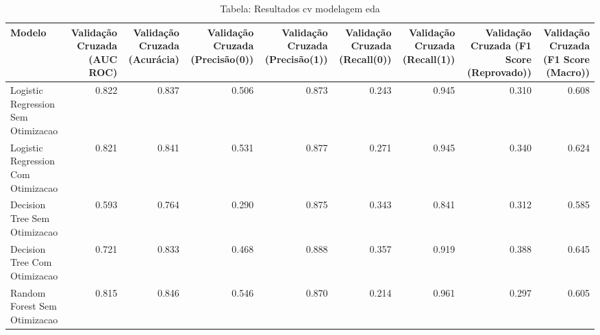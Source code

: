 \begin{table}[H] %
    \centering
    \caption{Tabela: Resultados cv modelagem eda}
    \label{tab:resultados_cv_modelagem_eda}
    \renewcommand{\arraystretch}{1.25} %
    \begin{adjustwidth}{ -1in }{ -1in } %
    \centering %
    \small %
    \begin{tabular}{lrrrrrrrr}
\toprule
                            Modelo &  Validação Cruzada (AUC ROC) &  Validação Cruzada (Acurácia) &  Validação Cruzada (Precisão(0)) &  Validação Cruzada (Precisão(1)) &  Validação Cruzada (Recall(0)) &  Validação Cruzada (Recall(1)) &  Validação Cruzada (F1 Score (Reprovado)) &  Validação Cruzada (F1 Score (Macro)) \\
\midrule
Logistic Regression Sem Otimizacao &                        0.822 &                         0.837 &                            0.506 &                            0.873 &                          0.243 &                          0.945 &                                     0.310 &                                 0.608 \\
Logistic Regression Com Otimizacao &                        0.821 &                         0.841 &                            0.531 &                            0.877 &                          0.271 &                          0.945 &                                     0.340 &                                 0.624 \\
      Decision Tree Sem Otimizacao &                        0.593 &                         0.764 &                            0.290 &                            0.875 &                          0.343 &                          0.841 &                                     0.312 &                                 0.585 \\
      Decision Tree Com Otimizacao &                        0.721 &                         0.833 &                            0.468 &                            0.888 &                          0.357 &                          0.919 &                                     0.388 &                                 0.645 \\
      Random Forest Sem Otimizacao &                        0.815 &                         0.846 &                            0.546 &                            0.870 &                          0.214 &                          0.961 &                                     0.297 &                                 0.605 \\

\end{tabular}
\end{adjustwidth}
\end{table}

